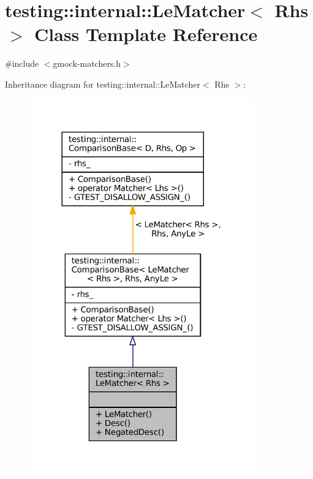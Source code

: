 \hypertarget{classtesting_1_1internal_1_1LeMatcher}{}\section{testing\+:\+:internal\+:\+:Le\+Matcher$<$ Rhs $>$ Class Template Reference}
\label{classtesting_1_1internal_1_1LeMatcher}


{\ttfamily \#include $<$gmock-\/matchers.\+h$>$}



Inheritance diagram for testing\+:\+:internal\+:\+:Le\+Matcher$<$ Rhs $>$\+:
\nopagebreak
\begin{figure}[H]
\begin{center}
\leavevmode
\includegraphics[width=276pt]{classtesting_1_1internal_1_1LeMatcher__inherit__graph}
\end{center}
\end{figure}


